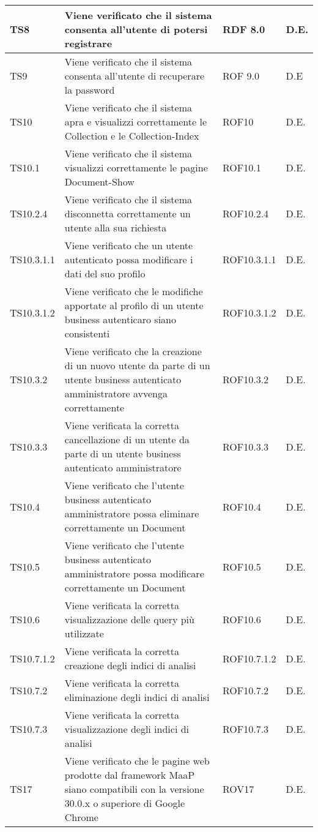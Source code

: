 \begin{center}
\begin{longtable}{|p{2cm}|p{7cm}|p{2cm}|p{2cm}|}
\midrule
TS8 & Viene verificato che il sistema consenta all'utente di potersi registrare & RDF 8.0 & D.E.\\
\midrule
TS9 & Viene verificato che il sistema consenta all'utente di recuperare la password  & ROF 9.0 & D.E\\
\midrule
TS10 & Viene verificato che il sistema apra e visualizzi correttamente le Collection e le Collection-Index & ROF10 & D.E.\\
\midrule
TS10.1 & Viene verificato che il sistema visualizzi correttamente le pagine Document-Show & ROF10.1 & D.E.\\
\midrule
TS10.2.4 & Viene verificato che il sistema disconnetta correttamente un utente alla sua richiesta & ROF10.2.4 & D.E.\\
\midrule
TS10.3.1.1 & Viene verificato che un utente autenticato possa modificare i dati del suo profilo & ROF10.3.1.1 & D.E.\\
\midrule
TS10.3.1.2 & Viene verificato che le modifiche apportate al profilo di un utente business autenticaro siano consistenti & ROF10.3.1.2 & D.E.\\
\midrule
TS10.3.2 & Viene verificato che la creazione di un nuovo utente da parte di un utente business autenticato amministratore avvenga correttamente & ROF10.3.2 & D.E.\\
\midrule
TS10.3.3 & Viene verificata la corretta cancellazione di un utente da parte di un utente business autenticato amministratore & ROF10.3.3 & D.E.\\
\midrule
TS10.4 & Viene verificato che l'utente business autenticato amministratore possa eliminare correttamente un Document & ROF10.4 & D.E.\\
\midrule
TS10.5 & Viene verificato che l’utente business autenticato amministratore possa modificare correttamente un Document & ROF10.5 & D.E.\\
\midrule
TS10.6 & Viene verificata la corretta visualizzazione delle query più utilizzate & ROF10.6 & D.E.\\
\midrule
TS10.7.1.2 & Viene verificata la corretta creazione degli indici di analisi & ROF10.7.1.2 & D.E.\\
\midrule
TS10.7.2 & Viene verificata la corretta eliminazione degli indici di analisi & ROF10.7.2 & D.E.\\
\midrule
TS10.7.3 & Viene verificata la corretta visualizzazione degli indici di analisi & ROF10.7.3 & D.E.\\
\midrule
TS17 & Viene verificato che le pagine web prodotte dal framework MaaP siano compatibili con la versione 30.0.x o superiore di Google Chrome & ROV17 & D.E.\\

\end{longtable}
\end{center}
